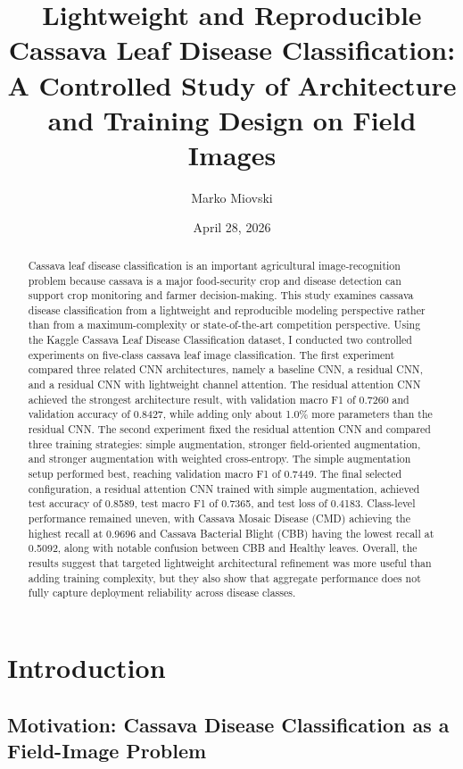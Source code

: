 \documentclass[11pt]{article}
\title{\textbf{Lightweight and Reproducible Cassava Leaf Disease Classification: A Controlled Study of Architecture and Training Design on Field Images}}
\author{Marko Miovski}
\date{April 28, 2026}
\begin{document}
\maketitle

\begin{abstract}
Cassava leaf disease classification is an important agricultural image-recognition problem because cassava is a major food-security crop and disease detection can support crop monitoring and farmer decision-making. This study examines cassava disease classification from a lightweight and reproducible modeling perspective rather than from a maximum-complexity or state-of-the-art competition perspective. Using the Kaggle Cassava Leaf Disease Classification dataset, I conducted two controlled experiments on five-class cassava leaf image classification. The first experiment compared three related CNN architectures, namely a baseline CNN, a residual CNN, and a residual CNN with lightweight channel attention. The residual attention CNN achieved the strongest architecture result, with validation macro F1 of 0.7260 and validation accuracy of 0.8427, while adding only about 1.0\% more parameters than the residual CNN. The second experiment fixed the residual attention CNN and compared three training strategies: simple augmentation, stronger field-oriented augmentation, and stronger augmentation with weighted cross-entropy. The simple augmentation setup performed best, reaching validation macro F1 of 0.7449. The final selected configuration, a residual attention CNN trained with simple augmentation, achieved test accuracy of 0.8589, test macro F1 of 0.7365, and test loss of 0.4183. Class-level performance remained uneven, with Cassava Mosaic Disease (CMD) achieving the highest recall at 0.9696 and Cassava Bacterial Blight (CBB) having the lowest recall at 0.5092, along with notable confusion between CBB and Healthy leaves. Overall, the results suggest that targeted lightweight architectural refinement was more useful than adding training complexity, but they also show that aggregate performance does not fully capture deployment reliability across disease classes.
\end{abstract}

\newpage
\tableofcontents
\newpage

\section{Introduction}

\subsection{Motivation: Cassava Disease Classification as a Field-Image Problem}
\end{document}
